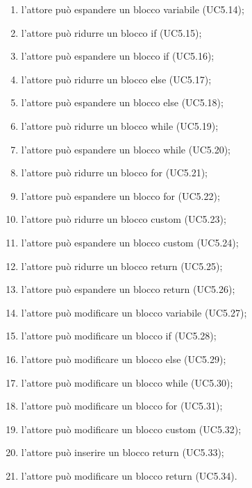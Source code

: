\begin{itemize}
\begin{enumerate}
		\item l'attore può espandere un blocco variabile (UC5.14);
		\item l'attore può ridurre un blocco if (UC5.15);
		\item l'attore può espandere un blocco if (UC5.16);
		\item l'attore può ridurre un blocco else (UC5.17);
		\item l'attore può espandere un blocco else (UC5.18);
		\item l'attore può ridurre un blocco while (UC5.19);
		\item l'attore può espandere un blocco while (UC5.20);
		\item l'attore può ridurre un blocco for (UC5.21);
		\item l'attore può espandere un blocco for (UC5.22);
		\item l'attore può ridurre un blocco custom (UC5.23);
		\item l'attore può espandere un blocco custom (UC5.24);
		\item l'attore può ridurre un blocco return (UC5.25);
		\item l'attore può espandere un blocco return (UC5.26);
		\item l'attore può modificare un blocco variabile (UC5.27);
		\item l'attore può modificare un blocco if (UC5.28);
		\item l'attore può modificare un blocco else (UC5.29);
		\item l'attore può modificare un blocco while (UC5.30);
		\item l'attore può modificare un blocco for (UC5.31);
		\item l'attore può modificare un blocco custom (UC5.32);
		\item l'attore può inserire un blocco return (UC5.33);
		\item l'attore può modificare un blocco return (UC5.34).
	\end{enumerate}
\end{itemize}

